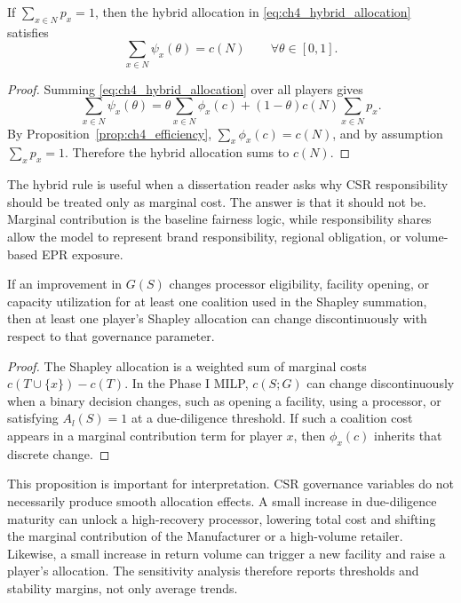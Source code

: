 \begin{proposition}
\label{prop:ch4_hybrid_efficiency}
If $\sum_{x\in N}p_x=1$, then the hybrid allocation in \eqref{eq:ch4_hybrid_allocation} satisfies
\begin{equation}
\label{eq:ch4_hybrid_efficiency}
\sum_{x\in N}\psi_x(\theta)=c(N)
\qquad \forall \theta\in[0,1].
\end{equation}
\end{proposition}

\begin{proof}
Summing \eqref{eq:ch4_hybrid_allocation} over all players gives
\begin{equation*}
\sum_{x\in N}\psi_x(\theta)
=\theta\sum_{x\in N}\phi_x(c)+(1-\theta)c(N)\sum_{x\in N}p_x.
\end{equation*}
By Proposition~\ref{prop:ch4_efficiency}, $\sum_x\phi_x(c)=c(N)$, and by assumption $\sum_xp_x=1$. Therefore the hybrid allocation sums to $c(N)$.
\end{proof}

The hybrid rule is useful when a dissertation reader asks why CSR responsibility should be treated only as marginal cost. The answer is that it should not be. Marginal contribution is the baseline fairness logic, while responsibility shares allow the model to represent brand responsibility, regional obligation, or volume-based EPR exposure.

\begin{proposition}
\label{prop:ch4_nonlinear_allocation}
If an improvement in $G(S)$ changes processor eligibility, facility opening, or capacity utilization for at least one coalition used in the Shapley summation, then at least one player's Shapley allocation can change discontinuously with respect to that governance parameter.
\end{proposition}

\begin{proof}
The Shapley allocation is a weighted sum of marginal costs $c(T\cup\{x\})-c(T)$. In the Phase I MILP, $c(S;G)$ can change discontinuously when a binary decision changes, such as opening a facility, using a processor, or satisfying $A_l(S)=1$ at a due-diligence threshold. If such a coalition cost appears in a marginal contribution term for player $x$, then $\phi_x(c)$ inherits that discrete change.
\end{proof}

This proposition is important for interpretation. CSR governance variables do not necessarily produce smooth allocation effects. A small increase in due-diligence maturity can unlock a high-recovery processor, lowering total cost and shifting the marginal contribution of the Manufacturer or a high-volume retailer. Likewise, a small increase in return volume can trigger a new facility and raise a player's allocation. The sensitivity analysis therefore reports thresholds and stability margins, not only average trends.

